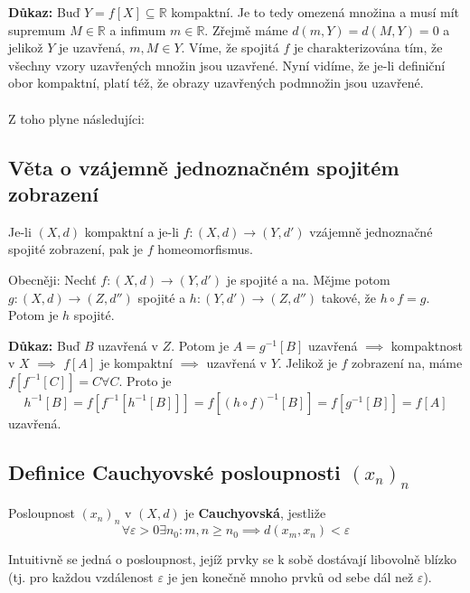 \documentclass[../main.tex]{subfiles}
\begin{document}
\vspace{5mm}
\noindent
\textbf{Důkaz:} Buď $Y = f[X] \subseteq \mathbb{R}$ kompaktní. Je to tedy omezená množina a musí mít supremum $M\in \mathbb{R}$ a infimum $m\in \mathbb{R}$. Zřejmě máme 
$d(m,Y) = d(M,Y) = 0$ a jelikož $Y$ je uzavřená, $m,M \in Y$. Víme, že spojitá $f$ je charakterizována tím, že všechny vzory uzavřených množin
jsou uzavřené. Nyní vidíme, že je-li definiční obor kompaktní, platí též, že obrazy uzavřených podmnožin jsou uzavřené. 
\\
\\
Z toho plyne následujíci:

\subsection{Věta o vzájemně jednoznačném spojitém zobrazení}
\hspace{1.2mm}
\noindent
Je-li $(X,d)$ kompaktní a je-li $f: (X,d) \to (Y,d')$ vzájemně jednoznačné spojité zobrazení, pak je
$f$ homeomorfismus.

\vspace{2mm}
\hspace{1.2mm}
{\small
Obecněji: Nechť $f:(X,d) \to (Y,d')$ je spojité a na. Mějme potom $g: (X,d) \to (Z, d'')$ spojité a
$h: (Y,d') \to (Z,d'')$ takové, že $h \circ f = g$. Potom je $h$ spojité.}

\vspace{5mm}
\noindent
\textbf{Důkaz:} Buď $B$ uzavřená v $Z$. Potom je $A = g^{-1}[B]$ uzavřená $\implies$ kompaktnost v $X$ $\implies$ $f[A]$ je kompaktní $\implies$ uzavřená v $Y$. Jelikož  je $f$ zobrazení na, máme $f[f^{-1}[C]] = C \forall C$. Proto je 
\[h^{-1}[B] = f[f^{-1}[h^{-1}[B]]] = f[(h \circ f)^{-1}[B]] = f[g^{-1}[B]] = f[A]\]
uzavřená.

\subsection{Definice Cauchyovské posloupnosti $(x_n)_n$}
\hspace{1.2mm}
\noindent
Posloupnost $(x_n)_n$ v $(X,d)$ je \textbf{Cauchyovská}, jestliže
\[ \forall \varepsilon > 0 \exists n_0: m,n \geq n_0 \implies d(x_m, x_n) < \varepsilon \]

Intuitivně se jedná o posloupnost, jejíž prvky se k sobě dostávají libovolně blízko (tj. pro každou vzdálenost $\varepsilon$ je jen konečně mnoho prvků od sebe dál než $\varepsilon$).
\end{document}

